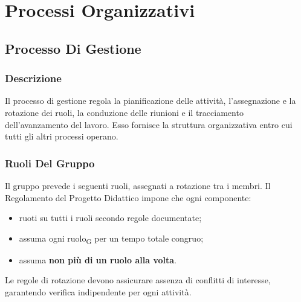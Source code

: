 \section{Processi Organizzativi}
 
\subsection{Processo Di Gestione}
\label{sec:gestione}
 
\subsubsection{Descrizione}
 
Il processo di gestione regola la pianificazione delle attività, l'assegnazione e
la rotazione dei ruoli, la conduzione delle riunioni e il tracciamento
dell'avanzamento del lavoro. Esso fornisce la struttura organizzativa entro cui
tutti gli altri processi operano.
 
\subsubsection{Ruoli Del Gruppo}
\label{sec:ruoli}
 
Il gruppo prevede i seguenti ruoli, assegnati a rotazione tra i membri. Il
Regolamento del Progetto Didattico impone che ogni componente:
 
\begin{itemize}
  \item ruoti su tutti i ruoli secondo regole documentate;
  \item assuma ogni ruolo\textsubscript{G} per un tempo totale congruo;
  \item assuma \textbf{non più di un ruolo alla volta}.
\end{itemize}
 
Le regole di rotazione devono assicurare assenza di conflitti di interesse,
garantendo verifica indipendente per ogni attività.
 

